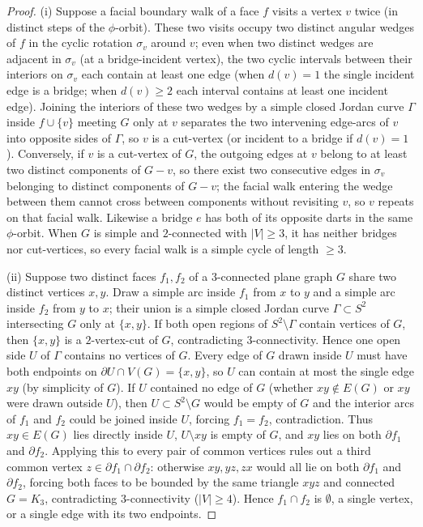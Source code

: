 \documentclass[11pt,reqno]{amsart}
\theoremstyle{plain}
\theoremstyle{definition}
\theoremstyle{remark}
\DeclareRobustCommand{\_}{\ifmmode\text{\textunderscore}\else\textunderscore\allowbreak\fi}
\begin{document}
\begin{proof}
(i) Suppose a facial boundary walk of a face $f$ visits a vertex $v$ twice (in distinct steps of the $\phi$-orbit). These two visits occupy two distinct angular wedges of $f$ in the cyclic rotation $\sigma_v$ around $v$; even when two distinct wedges are adjacent in $\sigma_v$ (at a bridge-incident vertex), the two cyclic intervals between their interiors on $\sigma_v$ each contain at least one edge (when $d(v) = 1$ the single incident edge is a bridge; when $d(v) \ge 2$ each interval contains at least one incident edge). Joining the interiors of these two wedges by a simple closed Jordan curve $\Gamma$ inside $f \cup \{v\}$ meeting $G$ only at $v$ separates the two intervening edge-arcs of $v$ into opposite sides of $\Gamma$, so $v$ is a cut-vertex (or incident to a bridge if $d(v)=1$). Conversely, if $v$ is a cut-vertex of $G$, the outgoing edges at $v$ belong to at least two distinct components of $G - v$, so there exist two consecutive edges in $\sigma_v$ belonging to distinct components of $G - v$; the facial walk entering the wedge between them cannot cross between components without revisiting $v$, so $v$ repeats on that facial walk. Likewise a bridge $e$ has both of its opposite darts in the same $\phi$-orbit. When $G$ is simple and $2$-connected with $|V| \ge 3$, it has neither bridges nor cut-vertices, so every facial walk is a simple cycle of length $\ge 3$.

(ii) Suppose two distinct faces $f_1, f_2$ of a $3$-connected plane graph $G$ share two distinct vertices $x, y$. Draw a simple arc inside $f_1$ from $x$ to $y$ and a simple arc inside $f_2$ from $y$ to $x$; their union is a simple closed Jordan curve $\Gamma \subset S^2$ intersecting $G$ only at $\{x, y\}$. If both open regions of $S^2 \setminus \Gamma$ contain vertices of $G$, then $\{x, y\}$ is a $2$-vertex-cut of $G$, contradicting $3$-connectivity. Hence one open side $U$ of $\Gamma$ contains no vertices of $G$. Every edge of $G$ drawn inside $U$ must have both endpoints on $\partial U \cap V(G) = \{x, y\}$, so $U$ can contain at most the single edge $xy$ (by simplicity of $G$). If $U$ contained no edge of $G$ (whether $xy \notin E(G)$ or $xy$ were drawn outside $U$), then $U \subset S^2 \setminus G$ would be empty of $G$ and the interior arcs of $f_1$ and $f_2$ could be joined inside $U$, forcing $f_1 = f_2$, contradiction. Thus $xy \in E(G)$ lies directly inside $U$, $U \setminus xy$ is empty of $G$, and $xy$ lies on both $\partial f_1$ and $\partial f_2$. Applying this to every pair of common vertices rules out a third common vertex $z \in \partial f_1 \cap \partial f_2$: otherwise $xy, yz, zx$ would all lie on both $\partial f_1$ and $\partial f_2$, forcing both faces to be bounded by the same triangle $xyz$ and connected $G = K_3$, contradicting $3$-connectivity ($|V| \ge 4$). Hence $f_1 \cap f_2$ is $\emptyset$, a single vertex, or a single edge with its two endpoints.


\end{proof}
\end{document}
